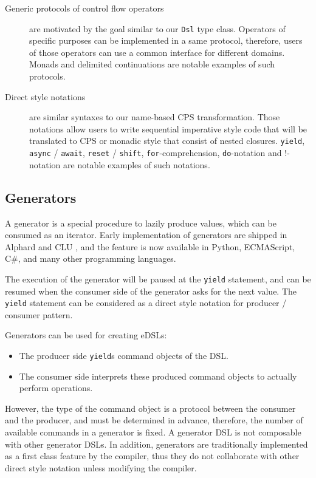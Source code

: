 \begin{description}
  \item[Generic protocols of control flow operators] are motivated by the goal similar to our \lstinline{Dsl} type class. Operators of specific purposes can be implemented in a same protocol, therefore, users of those operators can use a common interface for different domains. Monads and delimited continuations are notable examples of such protocols.
  \item[Direct style notations] are similar syntaxes to our name-based CPS transformation. Those notations allow users to write sequential imperative style code that will be translated to CPS or monadic style that consist of nested closures. \lstinline{yield}, \lstinline{async} / \lstinline{await}, \lstinline{reset} / \lstinline{shift}, \lstinline{for}-comprehension, \lstinline{do}-notation and !-notation are notable examples of such notations.
\end{description}

\subsection{Generators}

A generator is a special procedure to lazily produce values, which can be consumed as an iterator. Early implementation of generators are shipped in Alphard \cite{shaw1977abstraction} and CLU \cite{liskov1977abstraction}, and the feature is now available in  Python, ECMAScript, C\#, and many other programming languages.

The execution of the generator will be paused at the \lstinline{yield} statement, and can be resumed when the consumer side of the generator asks for the next value. The \lstinline{yield} statement can be considered as a direct style notation for producer / consumer pattern.

Generators can be used for creating eDSLs:

\begin{itemize}
  \item The producer side \lstinline{yield}s command objects of the DSL.
  \item The consumer side interprets these produced command objects to actually perform operations.
\end{itemize}

However, the type of the command object is a protocol between the consumer and the producer, and must be determined in advance, therefore, the number of available commands in a generator is fixed. A generator DSL is not composable with other generator DSLs. In addition, generators are traditionally implemented as a first class feature by the compiler, thus they do not collaborate with other direct style notation unless modifying the compiler.

